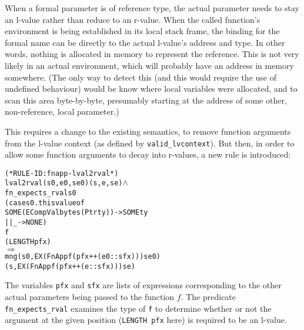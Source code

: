 \documentclass[11pt]{article}
\begin{document}
When a formal parameter is of reference type, the actual parameter
needs to stay an l-value rather than reduce to an r-value.  When the
called function's environment is being established in its local stack
frame, the binding for the formal name can be directly to the actual
l-value's address and type.  In other words, nothing is allocated in
memory to represent the reference.  This is not very likely in an
actual environment, which will probably have an address in memory
somewhere.  (The only way to detect this (and this would require the
use of undefined behaviour) would be know where local variables were
allocated, and to scan this area byte-by-byte, presumably starting at
the address of some other, non-reference, local parameter.)

This requires a change to the existing semantics, to remove function
arguments from the l-value context (as defined by
\texttt{valid_lvcontext}).
But then, in order to allow some function arguments to decay into
r-values, a new rule is introduced:
\begin{center}
\begin{minipage}{\textwidth}
%
\begin{alltt}
(* RULE-ID: fnapp-lval2rval *)
     lval2rval (s0,e0,se0) (s,e,se) \(\land\)
     fn_expects_rval s0
       (case s0.thisvalue of
           SOME (ECompVal bytes (Ptr ty)) -> SOME ty
        || _ -> NONE)
       f
       (LENGTH pfx)
   \(\Rightarrow\)
     mng (s0, EX (FnApp f (pfx ++ (e0 :: sfx))) se0)
         (s, EX (FnApp f (pfx ++ (e :: sfx))) se)
\end{alltt}
\end{minipage}
\end{center}
The variables \texttt{pfx} and \texttt{sfx} are lists of expressions
corresponding to the other actual parameters being passed to the
function $f$.  The predicate \texttt{fn_expects_rval} examines the
type of \texttt{f} to determine whether or not the argument at the
given position (\texttt{LENGTH~pfx} here) is required to be an l-value.
\end{document}
